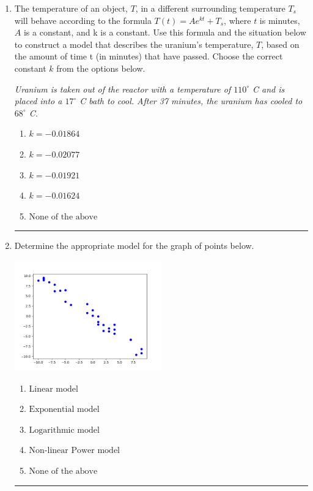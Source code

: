 \documentclass[14pt]{extbook}
\newcommand{\litem}[1]{\item#1\hspace*{-1cm}\rule{\textwidth}{0.4pt}}
\begin{document}
\begin{enumerate}
{\begin{enumerate}[label=\Alph*.]
\end{enumerate} }
\litem{
The temperature of an object, $T$, in a different surrounding temperature $T_s$ will behave according to the formula $T(t) = Ae^{kt} + T_s$, where $t$ is minutes, $A$ is a constant, and k is a constant. Use this formula and the situation below to construct a model that describes the uranium's temperature, $T$, based on the amount of time t (in minutes) that have passed. Choose the correct constant $k$ from the options below.
\begin{center}
    \textit{ Uranium is taken out of the reactor with a temperature of $110^{\circ}$ C and is placed into a $17^{\circ}$ C bath to cool. After 37 minutes, the uranium has cooled to $68^{\circ}$ C. }
\end{center}
\begin{enumerate}[label=\Alph*.]
\item \( k = -0.01864 \)
\item \( k = -0.02077 \)
\item \( k = -0.01921 \)
\item \( k = -0.01624 \)
\item \( \text{None of the above} \)

\end{enumerate} }
\litem{
Determine the appropriate model for the graph of points below.
\begin{center}
    \includegraphics[width=0.5\textwidth]{../Figures/identifyModelGraph11CopyC.png}
\end{center}
\begin{enumerate}[label=\Alph*.]
\item \( \text{Linear model} \)
\item \( \text{Exponential model} \)
\item \( \text{Logarithmic model} \)
\item \( \text{Non-linear Power model} \)
\item \( \text{None of the above} \)


\end{enumerate}}
\end{enumerate}
\end{document}
